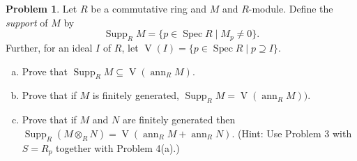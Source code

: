\documentclass[11pt]{article}
\theoremstyle{definition}
\newtheorem{problem}{Problem}
\newcommand{\V}{\operatorname{V}}
\newcommand{\Spec}{\operatorname{Spec}}
\newcommand{\Supp}{\operatorname{Supp}}
\newcommand{\ann}{\operatorname{ann}}
\begin{document}
\begin{problem} Let $R$ be a commutative ring and $M$ and $R$-module.  Define the {\it support} of $M$ by
$$\Supp_R M=\{p\in \Spec R\mid M_p\neq 0\}.$$  Further, for an ideal $I$ of $R$, let $\V(I)=\{p\in \Spec R\mid p\supseteq I\}$.
\begin{enumerate}[(a)]
\item Prove that $\Supp_R M\subseteq \V(\ann_R M)$.
\item Prove that if $M$ is finitely generated, $\Supp_R M=\V(\ann_R M))$.
\item Prove that if $M$ and $N$ are finitely generated then $\Supp_R (M\otimes_R N)=\V(\ann_R M+\ann_R N)$. (Hint: Use Problem 3 with $S=R_p$ together with Problem 4(a).)
\end{enumerate}

\end{problem}
\end{document}
